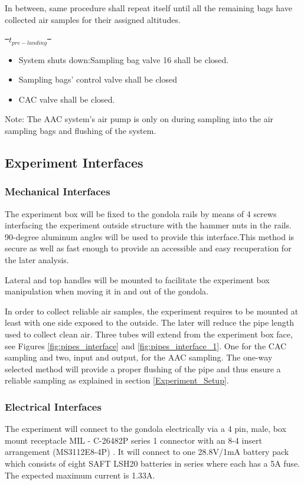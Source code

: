 \documentclass[a4paper,12pt,twoside]{article}
\providecommand{\DIFaddtex}[1]{{\protect\color{blue}\uwave{#1}}} %
\providecommand{\DIFdeltex}[1]{{\protect\color{red}\sout{#1}}}                      %
\providecommand{\DIFaddbegin}{} %
\providecommand{\DIFaddend}{} %
\providecommand{\DIFdelbegin}{} %
\providecommand{\DIFdelend}{} %
\providecommand{\DIFadd}[1]{\texorpdfstring{\DIFaddtex{#1}}{#1}} %
\providecommand{\DIFdel}[1]{\texorpdfstring{\DIFdeltex{#1}}{}} %
\newcommand{\DIFscaledelfig}{0.5}
\newlength{\DIFdelgraphicswidth} %
\newlength{\DIFdelgraphicsheight} %
\newcommand{\DIFaddincludegraphics}[2][]{{\color{blue}\fbox{\DIFOincludegraphics[#1]{#2}}}} %
\newcommand{\DIFdelincludegraphics}[2][]{%
\sbox{\DIFdelgraphicsbox}{\DIFOincludegraphics[#1]{#2}}%
\settoboxwidth{\DIFdelgraphicswidth}{\DIFdelgraphicsbox} %
\settoboxtotalheight{\DIFdelgraphicsheight}{\DIFdelgraphicsbox} %
\scalebox{\DIFscaledelfig}{%
\parbox[b]{\DIFdelgraphicswidth}{\usebox{\DIFdelgraphicsbox}\\[-\baselineskip] \rule{\DIFdelgraphicswidth}{0em}}\llap{\resizebox{\DIFdelgraphicswidth}{\DIFdelgraphicsheight}{%
\setlength{\unitlength}{\DIFdelgraphicswidth}%
\begin{picture}(1,1)%
\thicklines\linethickness{2pt} %
{\color[rgb]{1,0,0}\put(0,0){\framebox(1,1){}}}%
{\color[rgb]{1,0,0}\put(0,0){\line( 1,1){1}}}%
{\color[rgb]{1,0,0}\put(0,1){\line(1,-1){1}}}%
\end{picture}%
}\hspace*{3pt}}} %
} %
\DeclareRobustCommand{\DIFaddbegin}{\DIFOaddbegin \let\includegraphics\DIFaddincludegraphics} %
\DeclareRobustCommand{\DIFaddend}{\DIFOaddend \let\includegraphics\DIFOincludegraphics} %
\DeclareRobustCommand{\DIFdelbegin}{\DIFOdelbegin \let\includegraphics\DIFdelincludegraphics} %
\DeclareRobustCommand{\DIFdelend}{\DIFOaddend \let\includegraphics\DIFOincludegraphics} %
\begin{document}
In between, same procedure shall repeat itself until all the remaining bags have collected air samples for their assigned altitudes.

\DIFdelbegin \DIFdel{\mbox{%
$t_{pre-landing}$
}%
}\DIFdelend \DIFaddbegin \DIFadd{\mbox{%
$p_{pre-landing}$
}%
}\DIFaddend \begin{itemize}
    \item System shuts down:Sampling bag valve 16 shall be closed.
    \item Sampling bags' control valve shall be closed
    \item CAC valve shall be closed.
\end{itemize}


Note: The AAC system's air pump is only on during sampling into the air sampling bags and flushing of the system.


\raggedbottom
\pagebreak
\subsection{Experiment Interfaces}

\subsubsection{Mechanical Interfaces}
The experiment box will be fixed to the gondola rails by means of 4 screws interfacing the experiment outside structure with the hammer nuts in the rails. 90-degree aluminum angles will be used to provide this interface.This method is secure as well as fast enough to provide an accessible and easy recuperation for the later analysis. 

Lateral and top handles will be mounted to facilitate the experiment box manipulation when moving it in and out of the gondola. 

In order to collect reliable air samples, the experiment requires to be mounted at least with one side exposed to the outside. The later will reduce the pipe length used to collect clean air. Three tubes will extend from the experiment box face, see Figures \ref{fig:pipes_interface} and \ref{fig:pipes_interface_1}. One for the CAC sampling and two, input and output, for the AAC sampling. The one-way selected method will provide a proper flushing of the pipe and thus ensure a reliable sampling as explained in section \ref{Experiment_Setup}.

\bigskip

\subsubsection{Electrical Interfaces}
\begin{centering}
The experiment will connect to the gondola electrically via a 4 pin, male, box mount receptacle MIL - C-26482P series 1 connector with an 8-4 insert arrangement (MS3112E8-4P) \cite{BexusManual}. It will connect to one 28.8V/1mA battery pack which consists of eight SAFT LSH20 batteries in series where each has a 5A fuse\cite{BexusManual}. The expected maximum current is 1.33A.
\end{centering}
\bigskip
\end{document}
